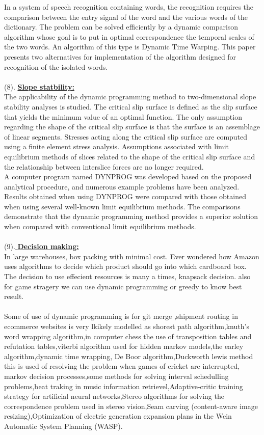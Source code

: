\documentclass[12pt]{book}
\begin{document}
In a system of speech recognition containing words, the recognition requires the comparison between the entry signal of the word and the various words of the dictionary. The 
problem can be solved efficiently by a dynamic comparison algorithm whose goal is to put in 
optimal correspondence the temporal scales of the two words. An algorithm of this type is 
Dynamic Time Warping. This paper presents two alternatives for implementation of the algorithm designed for recognition of the isolated words. 
\\\\
(8). \underline{
\textbf{Slope statbility:}}\\
The applicability of the dynamic programming method to two-dimensional slope stability analyses is studied. The critical slip surface is defined as the slip surface that yields the minimum value of an optimal function. The only assumption regarding the shape of the critical slip surface is that the surface is an assemblage of linear segments. Stresses acting along the critical slip surface are computed using a finite element stress analysis. Assumptions associated with limit equilibrium methods of slices related to the shape of the critical slip surface and the relationship between interslice forces are no longer required.\\ A computer program named DYNPROG was developed based on the proposed analytical procedure, and numerous example problems have been analyzed. Results obtained when using DYNPROG were compared with those obtained when using several well-known limit equilibrium methods. The comparisons demonstrate that the dynamic programming method provides a superior solution when compared with conventional limit equilibrium methods.
\\\\
(9).\underline{
\textbf{Decision making:}}\\
In large warehouses, box packing with minimal cost. Ever wondered how Amazon uses algorithms to decide which product should go into which cardboard box. The decision to use effecient resources is many a times, knapsack decision. also for game stragery we can use dynamic programming or greedy to know best result.
\\\\ 
Some of use of dynamic programming is for git merge ,shipment routing in ecommerce websites is very lkikely modelled as shorest path algorithm,knuth's word wrapping algorithm,in computer chess the use of transposition tables and refutation tables,viterbi algorithm used for hidden markov models,the earley algorithm,dynamic time wrapping, De Boor algorithm,Duckworth lewis method this is used of resolving the problem when games of cricket are interrupted, markov decision processes,some methods for solving interval schedulling problems,beat traking in music information retrievel,Adaptive-critic training strategy for artificial neural networks,Stereo algorithms for solving the correspondence problem used in stereo vision,Seam carving (content-aware image resizing),Optimization of electric generation expansion plans in the Wein Automatic System Planning (WASP).
\end{document}
